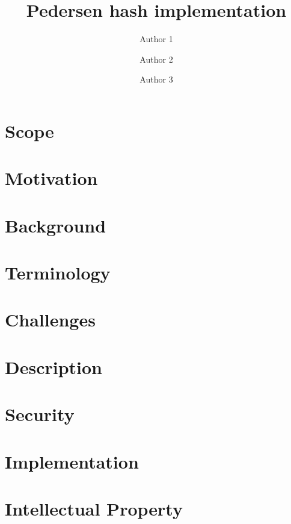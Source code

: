 \documentclass{article}
\title{ Pedersen hash implementation \vspace{-0.2cm} }
\author[1]{Author 1}
\author[2]{Author 2}
\author[1]{Author 3}
\affil[1]{Affiliation 1}
\affil[2]{Affiliation 2}
\date{} %
\begin{document}
\maketitle 
\vspace{1cm}
\tableofcontents

\vspace{0.5cm}


\section{Scope}						
	
\section{Motivation}				
	
\section{Background}				
	
\section{Terminology}				

\section{Challenges}				 

\section{Description}				

\section{Security}					
	
\section{Implementation}			
	
\section {Intellectual Property}	

%
%
\end{document}
